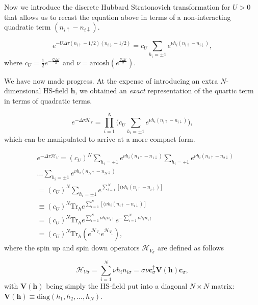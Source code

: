 \documentclass[10pt, twocolumn, twoside]{article}
\begin{document}
Now we introduce the discrete Hubbard Stratonovich transformation for $U > 0$ that allows us to recast the equation above in terms of a non-interacting quadratic term $(n_{i\uparrow} - n_{i\downarrow} )$.

\begin{equation}\label{eq:discreteHS}
e^{-U \Delta\tau (n_{i\uparrow} - 1/2 ) (n_{i\downarrow} - 1/2 )} = c_U \sum_{h_i = \pm 1} e^{\nu h_i (n_{i\uparrow} - n_{i\downarrow} )},
\end{equation}
where $c_U = \frac{1}{2} e^{-\frac{U\Delta \tau}{4}}$ and $\nu = \text{arcosh} ( e^{\frac{U\Delta\tau}{2}})$.

We have now made progress. At the expense of introducing an extra $N$-dimensional HS-field $\bm h$, we obtained an \emph{exact} representation of the quartic term in terms of quadratic terms.

\begin{equation} 
 e^{-\Delta\tau \mathcal{H}_V} = \prod_{i=1}^N \bigg( c_U \sum_{h_i = \pm 1} e^{\nu h_i ( n_{i\uparrow} - n_{i\downarrow} )} \bigg),
\end{equation} 
which can be manipulated to arrive at a more compact form.

\begin{equation}\label{eq:exp_quartic}
\begin{split}
&e^{-\Delta\tau \mathcal{H}_V} =  (c_U)^N \sum_{h_i = \pm 1} e^{\nu h_i ( n_{1\uparrow} - n_{1\downarrow} )} \sum_{h_i = \pm 1} e^{\nu h_i ( n_{2\uparrow} - n_{2\downarrow} )}  \\
&... \sum_{h_i = \pm 1} e^{\nu h_i ( n_{N\uparrow} - n_{N\downarrow} )} \\
&= (c_U)^N \sum_{h_i = \pm 1} e^{\sum_{i=1}^N [(\nu h_i ( n_{i\uparrow} - n_{i\downarrow} ) ]} \\
&\equiv (c_U)^N \text{Tr}_h e^{\sum_{i=1}^N [(\nu h_i ( n_{i\uparrow} - n_{i\downarrow} ) ]} \\
&= (c_U)^N \text{Tr}_h e^{\sum_{i=1}^N \nu h_i n_{i\uparrow}} e^{-\sum_{i=1}^N \nu h_i n_{i\uparrow}} \\
&= (c_U)^N \text{Tr}_h ( e^{\mathcal{H}_{V_\uparrow}} e^{\mathcal{H}_{V_\downarrow}} ) ,
\end{split}
\end{equation}
where the spin up and spin down operators $\mathcal{H}_{V_\sigma}$ are defined as follows

\begin{equation}
\mathcal{H}_{V\sigma} = \sum_{i=1}^N \nu h_i n_{i\sigma} = \sigma \nu \bm c_\sigma^\dagger \bm V(\bm h) \bm c_\sigma,
\end{equation}
with $\bm V(\bm h)$ being simply the HS-field put into a diagonal $N\times N$ matrix: $\bm V(\bm h) \equiv \text{diag}(h_1, h_2, ..., h_N)$.
\end{document}
